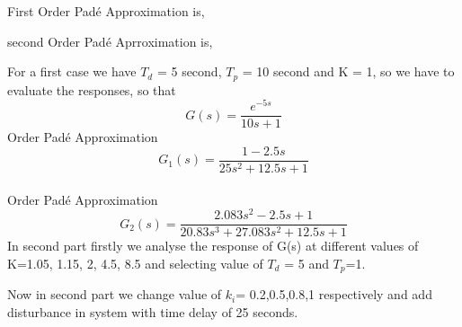 \message{ !name(lab1.tex)}\documentclass[a4paper,12pt,openany]{book}
\begin{document}
\noindent First Order Pad\'e Approximation is,
\begin{center}
\end{center}
second Order Pad\'e Aprroximation is,
\begin{center}
\end{center}
\noindent For a first case we have $T_d$ = 5 second, $T_p$ = 10 second and K = 1, so we
have to evaluate the responses, so that
\begin{equation}
 G(s) = \frac{ e^{-5s}}{10s + 1}
\end{equation}
 Order Pad\'e Approximation
\begin{equation}
  G_1(s) = \frac{1-2.5s}{25s^2+12.5s+1}
\end{equation} \\
 Order Pad\'e Approximation
\begin{equation}
  G_2(s) = \frac{2.083s^2-2.5s+1}{20.83s^3+27.083s^2+12.5s+1}
\end{equation}
In second part firstly we analyse the response of G(s) at different values of
K=1.05, 1.15, 2, 4.5, 8.5 and selecting value of $T_d$ = 5 and $T_p$=1. \par
Now in second part we change value of $k_i$= 0.2,0.5,0.8,1 respectively and add
disturbance in system with time delay of 25 seconds.
\end{document}
